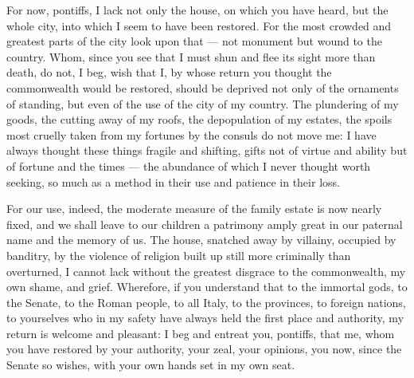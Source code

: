  For now, pontiffs, I lack not only the house, on which you have heard, but the whole city, into which I seem to have been restored. For the most crowded and greatest parts of the city look upon that --- not monument but wound to the country. Whom, since you see that I must shun and flee its sight more than death, do not, I beg, wish that I, by whose return you thought the commonwealth would be restored, should be deprived not only of the ornaments of standing, but even of the use of the city of my country. The plundering of my goods, the cutting away of my roofs, the depopulation of my estates, the spoils most cruelly taken from my fortunes by the consuls do not move me: I have always thought these things fragile and shifting, gifts not of virtue and ability but of fortune and the times --- the abundance of which I never thought worth seeking, so much as a method in their use and patience in their loss.

 For our use, indeed, the moderate measure of the family estate is now nearly fixed, and we shall leave to our children a patrimony amply great in our paternal name and the memory of us. The house, snatched away by villainy, occupied by banditry, by the violence of religion built up still more criminally than overturned, I cannot lack without the greatest disgrace to the commonwealth, my own shame, and grief. Wherefore, if you understand that to the immortal gods, to the Senate, to the Roman people, to all Italy, to the provinces, to foreign nations, to yourselves who in my safety have always held the first place and authority, my return is welcome and pleasant: I beg and entreat you, pontiffs, that me, whom you have restored by your authority, your zeal, your opinions, you now, since the Senate so wishes, with your own hands set in my own seat.

